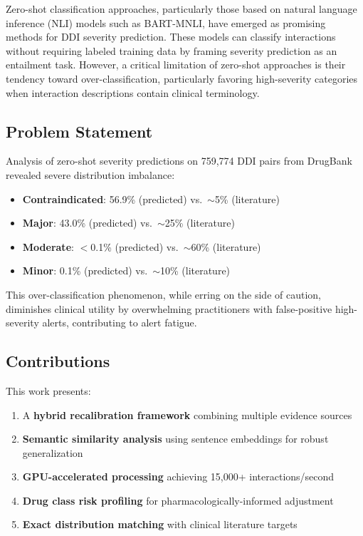 \documentclass[11pt,a4paper]{article}
\newcommand{\bart}{BART-MNLI}
\newcommand{\ninteractions}{759,774}
\begin{document}
Zero-shot classification approaches, particularly those based on natural language inference (NLI) models such as \bart{}, have emerged as promising methods for DDI severity prediction. These models can classify interactions without requiring labeled training data by framing severity prediction as an entailment task. However, a critical limitation of zero-shot approaches is their tendency toward over-classification, particularly favoring high-severity categories when interaction descriptions contain clinical terminology.

\subsection{Problem Statement}

Analysis of zero-shot severity predictions on \ninteractions{} DDI pairs from DrugBank revealed severe distribution imbalance:
\begin{itemize}
    \item \textbf{Contraindicated}: 56.9\% (predicted) vs.\ $\sim$5\% (literature)
    \item \textbf{Major}: 43.0\% (predicted) vs.\ $\sim$25\% (literature)
    \item \textbf{Moderate}: $<$0.1\% (predicted) vs.\ $\sim$60\% (literature)
    \item \textbf{Minor}: 0.1\% (predicted) vs.\ $\sim$10\% (literature)
\end{itemize}

This over-classification phenomenon, while erring on the side of caution, diminishes clinical utility by overwhelming practitioners with false-positive high-severity alerts, contributing to alert fatigue.

\subsection{Contributions}

This work presents:
\begin{enumerate}
    \item A \textbf{hybrid recalibration framework} combining multiple evidence sources
    \item \textbf{Semantic similarity analysis} using sentence embeddings for robust generalization
    \item \textbf{GPU-accelerated processing} achieving 15,000+ interactions/second
    \item \textbf{Drug class risk profiling} for pharmacologically-informed adjustment
    \item \textbf{Exact distribution matching} with clinical literature targets
\end{enumerate}
\end{document}

